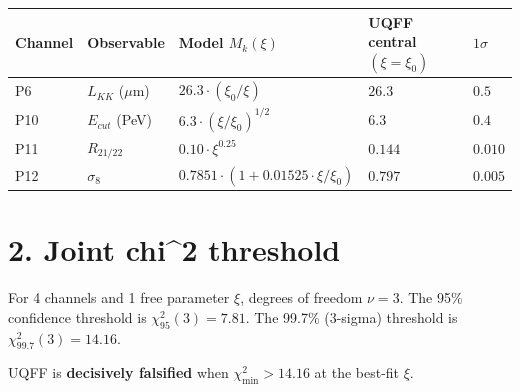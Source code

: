 \documentclass[
  11pt,
]{article}
\newcounter{none} %
\begin{document}
{\def\LTcaptype{none} %
\begin{longtable}[]{@{}
  >{\raggedleft\arraybackslash}p{}
  >{\raggedright\arraybackslash}p{}
  >{\raggedright\arraybackslash}p{}
  >{\raggedright\arraybackslash}p{}
  >{\raggedright\arraybackslash}p{}@{}}
\toprule\noalign{}
\begin{minipage}[b]{\linewidth}\raggedleft
Channel
\end{minipage} & \begin{minipage}[b]{\linewidth}\raggedright
Observable
\end{minipage} & \begin{minipage}[b]{\linewidth}\raggedright
Model \(M_k(\xi)\)
\end{minipage} & \begin{minipage}[b]{\linewidth}\raggedright
UQFF central \((\xi = \xi_0)\)
\end{minipage} & \begin{minipage}[b]{\linewidth}\raggedright
\(1\sigma\)
\end{minipage} \\
\midrule\noalign{}
\endhead
\bottomrule\noalign{}
\endlastfoot
P6 & \(L_{KK}\) (\(\mu\)m) & \(26.3 \cdot (\xi_0/\xi)\) & \(26.3\) &
\(0.5\) \\
P10 & \(E_{cut}\) (PeV) & \(6.3 \cdot (\xi/\xi_0)^{1/2}\) & \(6.3\) &
\(0.4\) \\
P11 & \(R_{21/22}\) & \(0.10 \cdot \xi^{0.25}\) & \(0.144\) &
\(0.010\) \\
P12 & \(\sigma_8\) & \(0.7851 \cdot (1 + 0.01525 \cdot \xi/\xi_0)\) &
\(0.797\) & \(0.005\) \\
\end{longtable}
}

\section{2. Joint chi\^{}2 threshold}\label{joint-chi2-threshold}

For 4 channels and 1 free parameter \(\xi\), degrees of freedom
\(\nu = 3\). The 95\% confidence threshold is \(\chi^2_{95}(3) = 7.81\).
The 99.7\% (3-sigma) threshold is \(\chi^2_{99.7}(3) = 14.16\).

UQFF is \textbf{decisively falsified} when \(\chi^2_{\min} > 14.16\) at
the best-fit \(\xi\).
\end{document}
